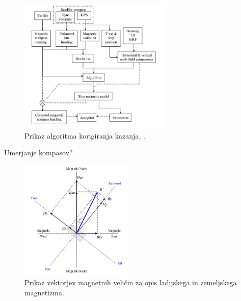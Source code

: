 

\begin{figure}[!ht]%
	\vspace{0pt}
	\begin{center}
		\includegraphics[width=0.65\textwidth]{Predavanja/02_KompasnoDolocSmeri/figs/2016AlgoritemKorigiranjaKompasa.png}
	\end{center}
	\vspace{0pt}
	\caption{Prikaz algoritma korigiranja kazanja, \cite{Basterr}.}
	\label{Fig_KorigiranjeKompasaMedPlovbo}
	\vspace{0pt}
\end{figure}

Umerjanje kompasov?

\begin{figure}[!ht]%
	\vspace{0pt}
	\begin{center}
		\includegraphics[width=0.48\textwidth]{Predavanja/02_KompasnoDolocSmeri/figs/2016LadijskiMagnetniVektorji.png}
	\end{center}
	\vspace{0pt}
	\caption{Prikaz vektorjev magnetnih veličin za opis ladijskega in zemeljskega magnetizma. \cite{Basterr}}
	\label{Fig_LadijskiMagnetniVektorji}
	\vspace{0pt}
\end{figure}

